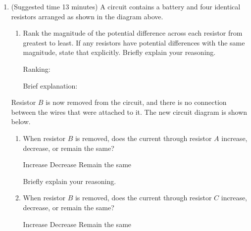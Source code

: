 \documentclass{../../../oss-apphys}
\begin{document}
\begin{center}
\end{center}
\begin{enumerate}[leftmargin=15pt]

\item (Suggested time 13 minutes) A circuit contains a battery and four
  identical resistors arranged as shown in the diagram above.
  \begin{enumerate}[leftmargin=15pt]
  \item Rank the magnitude of the potential difference across each resistor
    from greatest to least. If any resistors have potential differences with
    the same magnitude, state that explicitly. Briefly explain your reasoning.

    \vspace{.1in}Ranking:
    
    \vspace{.3in}Brief explanation:
  \end{enumerate}
  \vspace{.3in}Resistor $B$ is now removed from the circuit, and there is no
  connection between the wires that were attached to it. The new circuit
  diagram is shown below.
  \begin{center}
  \end{center}
  \begin{enumerate}[leftmargin=15pt,resume]
  \item When resistor $B$ is removed, does the current through resistor $A$
    increase, decrease, or remain the same?

    \vspace{.1in}
    \underline{\hspace{.3in}} Increase\hspace{.2in}
    \underline{\hspace{.3in}} Decrease\hspace{.2in}
    \underline{\hspace{.3in}} Remain the same
    
    \vspace{.1in}Briefly explain your reasoning.\vspace{.4in}
    
  \item When resistor $B$ is removed, does the current through resistor $C$
    increase, decrease, or remain the same?

    \vspace{.1in}
    \underline{\hspace{.3in}} Increase\hspace{.2in}
    \underline{\hspace{.3in}} Decrease\hspace{.2in}
    \underline{\hspace{.3in}} Remain the same
    

\end{enumerate}
\end{enumerate}
\end{document}
